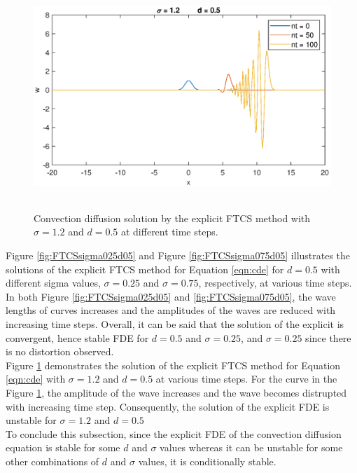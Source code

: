 \documentclass[letterpaper,12pt]{article}
\begin{document}
\begin{figure}[!ht] 
	\centering 
	\includegraphics[max height=8.5cm]{graphs/FTCS/ConvectionDiffusion/sigma12d05.eps}
	\caption{Convection diffusion solution by the explicit FTCS method with $\sigma= 1.2$ and $d=0.5$ at different time steps.}
	 \label{fig:FTCSsigma12d05}
\end{figure}
\newpage

Figure \ref{fig:FTCSsigma025d05} and Figure \ref{fig:FTCSsigma075d05} illustrates the solutions of the explicit FTCS
method for Equation \ref{eqn:cde} for $d=0.5$ with different sigma values, $\sigma= 0.25$ and $\sigma=0.75$,
respectively, at various time steps. In both Figure \ref{fig:FTCSsigma025d05}
and \ref{fig:FTCSsigma075d05}, the wave lengths of curves increases and the amplitudes of the waves are reduced
with increasing time steps. Overall, it can be said that the solution of the explicit is convergent, hence stable 
FDE for $d=0.5$ and $\sigma = 0.25$, and $\sigma = 0.25$ since there is no distortion observed.\\
\indent Figure \ref{fig:FTCSsigma12d05} demonstrates the solution of the explicit FTCS
method for Equation \ref{eqn:cde} with $\sigma= 1.2$ and $d=0.5$ at various time steps. For the curve in the
Figure \ref{fig:FTCSsigma12d05}, the amplitude of the wave increases and the wave becomes distrupted with 
increasing time step. Consequently, the solution of the explicit FDE is unstable for $\sigma=1.2$ and $d=0.5$\\
\indent To conclude this subsection, since the explicit FDE of the convection diffusion equation is stable for some $d$ 
and $\sigma$ values whereas it can be unstable for some other combinations of $d$ and $\sigma$ values, it is conditionally stable.
\newpage
\end{document}
